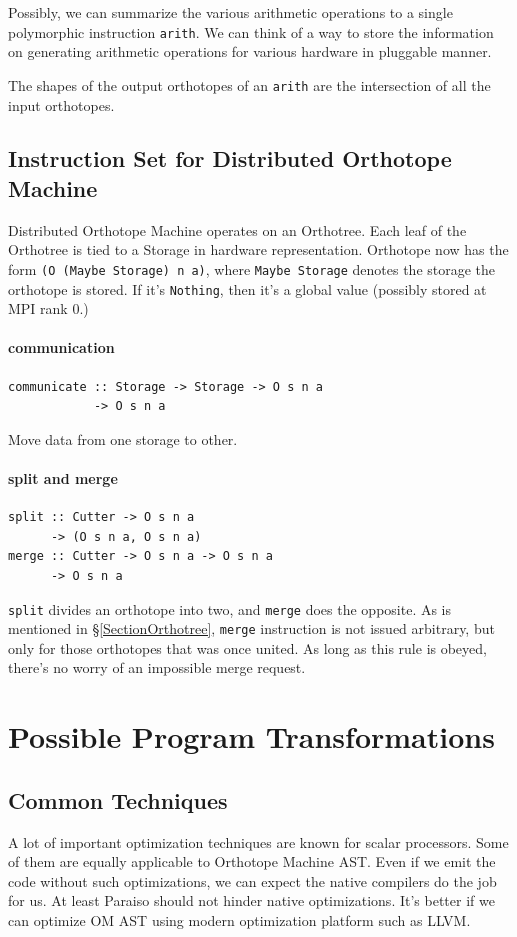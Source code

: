 \documentclass[twocolumn]{article}
\begin{document}
Possibly, we can summarize the various arithmetic operations to a single
polymorphic instruction {\tt arith}. We can think of a way to store the
information on generating arithmetic operations for various hardware in
pluggable manner.

The shapes of the output orthotopes of an {\tt arith} are the intersection
of all the input orthotopes.


\subsection{Instruction Set for Distributed Orthotope Machine}
Distributed Orthotope Machine operates on an Orthotree. Each leaf of the
Orthotree is tied to a Storage in hardware representation. Orthotope now has
the form {\tt (O (Maybe Storage) n a)}, where {\tt Maybe Storage} denotes the
storage the orthotope is stored. If it's {\tt Nothing}, then it's a global value
(possibly stored at MPI rank 0.)

\paragraph{communication}
\begin{verbatim}
communicate :: Storage -> Storage -> O s n a
            -> O s n a
\end{verbatim}
Move data from one storage to other.

\paragraph{split and merge}
\begin{verbatim}
split :: Cutter -> O s n a
      -> (O s n a, O s n a)
merge :: Cutter -> O s n a -> O s n a
      -> O s n a
\end{verbatim}
{\tt split} divides an orthotope into two, and {\tt merge} does the opposite.
As is mentioned in \S\ref{SectionOrthotree}, {\tt merge} instruction is not
issued arbitrary, but only for those orthotopes that was once united. As long
as this rule is obeyed, there's no worry of an impossible merge request.

\section{Possible Program Transformations}
\label{SectionOptimization}
\subsection{Common Techniques}
A lot of important optimization techniques are known for scalar
processors. Some of them are equally applicable to Orthotope Machine
AST.  Even if we emit the code without such optimizations, we can
expect the native compilers do the job for us. At least Paraiso should
not hinder native optimizations. It's better if we can optimize OM AST
using modern optimization platform such as LLVM.
\end{document}
